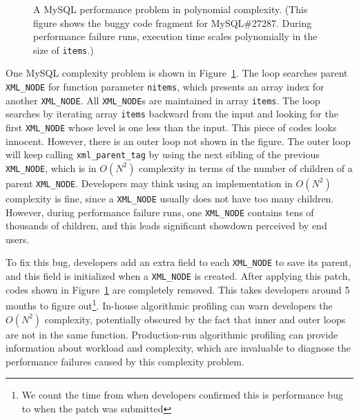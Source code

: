 \begin{figure}
\centering
{}
  \mbox{}
\caption{A MySQL performance problem in polynomial complexity. 
\footnotesize{(This figure shows the buggy code fragment for MySQL\#27287. 
   During performance failure runs, 
   execution time scales polynomially in the size of \texttt{items}.)}}
\vspace{-0.05in}
\label{fig:mysql27287}
\vspace{-0.05in}
\end{figure}


One MySQL complexity problem is shown in Figure~\ref{fig:mysql27287}.
The loop searches parent \texttt{XML\_NODE} for function parameter \texttt{nitems}, 
which presents an array index for another \texttt{XML\_NODE}.
All \texttt{XML\_NODE}s are maintained in array \texttt{items}. 
The loop searches by iterating array \texttt{items} 
backward from the input and looking for the first \texttt{XML\_NODE} 
whose level is one less than the input.
This piece of codes looks innocent. 
However, there is an outer loop not shown in the figure.
The outer loop will keep calling \texttt{xml\_parent\_tag} by using 
the next sibling of the previous \texttt{XML\_NODE}, 
which is in $O(N^2)$ complexity in terms of the number of children of a parent \texttt{XML\_NODE}. 
Developers may think using an implementation in $O(N^2)$ complexity is fine, 
since a \texttt{XML\_NODE} usually does not have too many children.
However, during performance failure runs, 
one \texttt{XML\_NODE} contains tens of thousands of children, 
and this leads significant showdown perceived by end users. 

To fix this bug, developers add an extra field to each \texttt{XML\_NODE} to save its parent, 
and this field is initialized when a \texttt{XML\_NODE} is created. 
After applying this patch, codes shown in Figure~\ref{fig:mysql27287} are completely removed.
This takes developers around 5 months to figure 
out\footnote{We count the time from when developers confirmed this is performance bug 
to when the patch was submitted}. 
In-house algorithmic profiling can warn developers the $O(N^2)$ complexity, 
potentially obscured by the fact that inner and outer loops are not in the same function. 
Production-run algorithmic profiling can provide information about workload and complexity,
which are invaluable to diagnose the performance failures caused by this complexity problem. 




